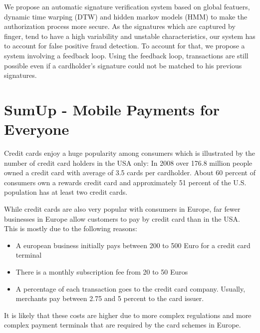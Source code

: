 \documentclass[a4paper, oneside]{csthesis}
\begin{document}
We propose an automatic signature verification system based on global featuers, dynamic time warping (DTW) and hidden markov models (HMM) to make the authorization process more secure. As the signatures which are captured by finger, tend to have a high variability and unstable characteristics, our system has to account for false positive fraud detection. To account for that, we propose a system involving a feedback loop. Using the feedback loop, transactions are still possible even if a cardholder's signature could not be matched to his previous signatures.





\section{SumUp - Mobile Payments for Everyone}
\label{intro-sumup}

Credit cards enjoy a huge popularity among consumers which is illustrated by the number of credit card holders in the USA only: In 2008 over 176.8 million people owned a credit card with average of 3.5 cards per cardholder. About 60 percent of consumers own a rewards credit card and approximately 51 percent of the U.S. population has at least two credit cards.\cite{woolsey2010credit}

While credit cards are also very popular with consumers in Europe, far fewer businesses in Europe allow customers to pay by credit card than in the USA. This is mostly due to the following reasons:
\begin{itemize}
\item A european business initially pays between 200 to 500 Euro for a credit card terminal
\item There is a monthly subscription fee from 20 to 50 Euros
\item A percentage of each transaction goes to the credit card company. Usually, merchants pay between 2.75 and 5 percent to the card issuer.
\end{itemize}

It is likely that these costs are higher due to more complex regulations and more complex payment terminals that are required by the card schemes in Europe.
\end{document}
